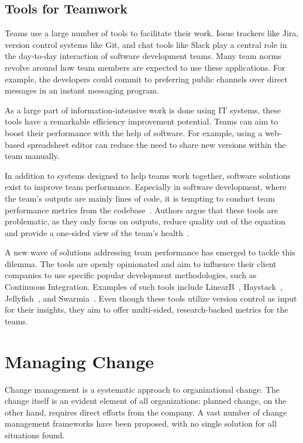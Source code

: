 \subsection{Tools for Teamwork}

Teams use a large number of tools to facilitate their work. Issue trackers like Jira, version control systems like Git, and chat tools like Slack play a central role in the day-to-day interaction of software development teams. Many team norms revolve around how team members are expected to use these applications. For example, the developers could commit to preferring public channels over direct messages in an instant messaging program.

 As a large part of information-intensive work is done using IT systems, these tools have a remarkable efficiency improvement potential. Teams can aim to boost their performance with the help of software. For example, using a web-based spreadsheet editor can reduce the need to share new versions within the team manually.

In addition to systems designed to help teams work together, software solutions exist to improve team performance. Especially in software development, where the team's outputs are mainly lines of code, it is tempting to conduct team performance metrics from the codebase~\cite{mcintosh_empirical_2016}. Authors argue that these tools are problematic, as they only focus on outputs, reduce quality out of the equation and provide a one-sided view of the team's health~\cite{forsgren_space_2021, forsgren_accelerate_2018, oliveira_code_2020}.

A new wave of solutions addressing team performance has emerged to tackle this dilemma. The tools are openly opinionated and aim to influence their client companies to use specific popular development methodologies, such as Continuous Integration. Examples of such tools include LinearB~\cite{linearb_developer_2022}, Haystack~\cite{haystack_haystack_2022}, Jellyfish~\cite{jellyfish_align_2022}, and Swarmia~\cite{swarmia_gain_2022}. Even though these tools utilize version control as input for their insights, they aim to offer multi-sided, research-backed metrics for the teams.

\section{Managing Change}

Change management is a systematic approach to organizational change. The change itself is an evident element of all organizations: planned change, on the other hand, requires direct efforts from the company. A vast number of change management frameworks have been proposed, with no single solution for all situations found.~\cite{todnem_organisational_2005}


